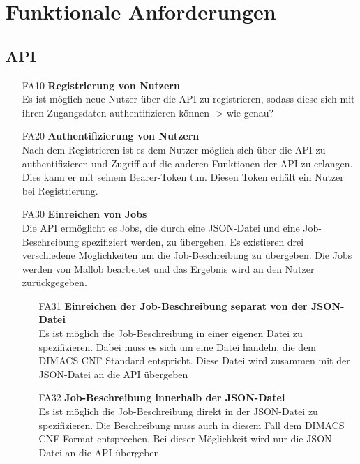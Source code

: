 \section{Funktionale Anforderungen}


\subsection{API}

\begin{itemize}
    \item[FA10] \textbf{Registrierung von Nutzern} \\
    Es ist möglich neue Nutzer über die API zu registrieren, sodass diese sich mit ihren Zugangsdaten authentifizieren können -> wie genau?
    
    \item[FA20] \textbf{Authentifizierung von Nutzern} \\
    Nach dem Registrieren ist es dem Nutzer möglich sich über die API zu authentifizieren und Zugriff auf die anderen Funktionen der API zu erlangen. Dies kann er mit seinem Bearer-Token tun. Diesen Token erhält ein Nutzer bei Registrierung.
    
    \item[FA30] \textbf{Einreichen von Jobs} \\
    Die API ermöglicht es Jobs, die durch eine JSON-Datei und eine Job-Beschreibung spezifiziert werden, zu übergeben. Es existieren drei verschiedene Möglichkeiten um die Job-Beschreibung zu übergeben. Die Jobs werden von Mallob bearbeitet und das Ergebnis wird an den Nutzer zurückgegeben.
    
    \begin{itemize}
        \item[FA31] \textbf{Einreichen der Job-Beschreibung separat von der JSON-Datei} \\
        Es ist möglich die Job-Beschreibung in einer eigenen Datei zu spezifizieren. Dabei muss es sich um eine Datei handeln, die dem DIMACS CNF Standard entspricht. Diese Datei wird zusammen mit der JSON-Datei an die API übergeben
        
        \item[FA32] \textbf{Job-Beschreibung innerhalb der JSON-Datei} \\
        Es ist möglich die Job-Beschreibung direkt in der JSON-Datei zu spezifizieren. Die Beschreibung muss auch in diesem Fall dem DIMACS CNF Format entsprechen. Bei dieser Möglichkeit wird nur die JSON-Datei an die API übergeben
        

\end{itemize}
\end{itemize}
